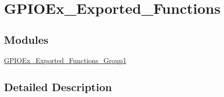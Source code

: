 \hypertarget{group___g_p_i_o_ex___exported___functions}{}\section{G\+P\+I\+O\+Ex\+\_\+\+Exported\+\_\+\+Functions}
\label{group___g_p_i_o_ex___exported___functions}
\subsection*{Modules}
\begin{DoxyCompactItemize}
\item 
\hyperlink{group___g_p_i_o_ex___exported___functions___group1}{G\+P\+I\+O\+Ex\+\_\+\+Exported\+\_\+\+Functions\+\_\+\+Group1}
\end{DoxyCompactItemize}


\subsection{Detailed Description}
